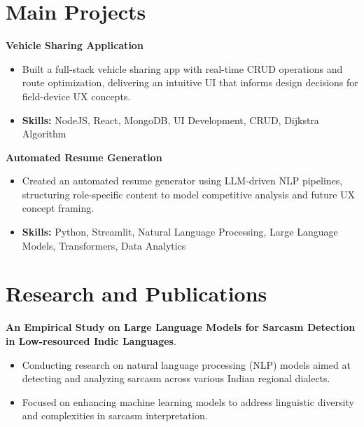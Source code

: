 \documentclass[a4paper,11pt]{article}
\begin{document}
\section{\textbf{Main Projects}}

\vspace{1mm}
  \textbf{Vehicle Sharing Application  }
\vspace{-1.5mm} %
\begin{itemize}
  \item Built a full-stack vehicle sharing app with real-time CRUD operations and route optimization, delivering an intuitive UI that informs design decisions for field-device UX concepts.
\vspace{-3mm}
  \item \textbf{Skills:} NodeJS, React, MongoDB, UI Development, CRUD, Dijkstra Algorithm
\end{itemize}


\vspace{1mm}
   \textbf{Automated Resume Generation }
\vspace{-1.5mm} %
\begin{itemize}
  \item Created an automated resume generator using LLM-driven NLP pipelines, structuring role-specific content to model competitive analysis and future UX concept framing.
\vspace{-3mm}
  \item \textbf{Skills:} Python, Streamlit, Natural Language Processing, Large Language Models, Transformers, Data Analytics
\end{itemize}



\section{\textbf{Research and Publications} \hfill }
\vspace{1mm}
  \textbf{An Empirical Study on Large Language Models for Sarcasm Detection in Low-resourced Indic Languages}.
\vspace{-1mm} %
\begin{itemize}
  \item Conducting research on natural language processing (NLP) models aimed at detecting and analyzing sarcasm across various Indian regional dialects.
\vspace{-3mm}
  \item Focused on enhancing machine learning models to address linguistic diversity and complexities in sarcasm interpretation.
\end{itemize}
\end{document}

